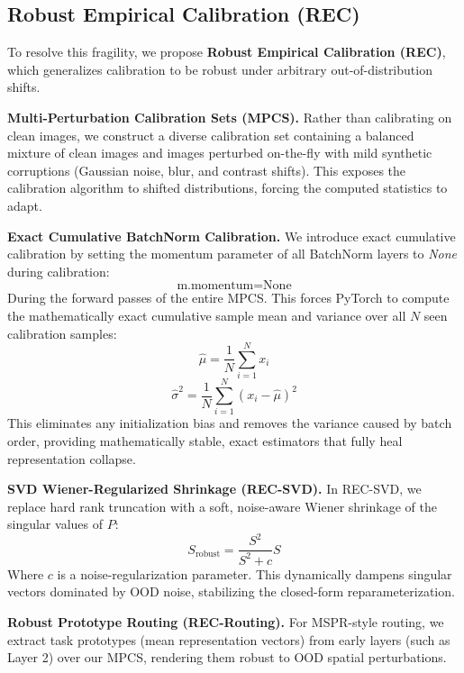 \documentclass{article}
\theoremstyle{plain}
\theoremstyle{definition}
\theoremstyle{remark}
\begin{document}
\subsection{Robust Empirical Calibration (REC)}
To resolve this fragility, we propose \textbf{Robust Empirical Calibration (REC)}, which generalizes calibration to be robust under arbitrary out-of-distribution shifts.

\textbf{Multi-Perturbation Calibration Sets (MPCS).} Rather than calibrating on clean images, we construct a diverse calibration set containing a balanced mixture of clean images and images perturbed on-the-fly with mild synthetic corruptions (Gaussian noise, blur, and contrast shifts). This exposes the calibration algorithm to shifted distributions, forcing the computed statistics to adapt.

\textbf{Exact Cumulative BatchNorm Calibration.} We introduce exact cumulative calibration by setting the momentum parameter of all BatchNorm layers to \textit{None} during calibration:
\begin{equation}
    \text{m.momentum} = \text{None}
\end{equation}
During the forward passes of the entire MPCS. This forces PyTorch to compute the mathematically exact cumulative sample mean and variance over all $N$ seen calibration samples:
\begin{equation}
    \hat{\mu} = \frac{1}{N} \sum_{i=1}^N x_i
\end{equation}
\begin{equation}
    \hat{\sigma}^2 = \frac{1}{N} \sum_{i=1}^N (x_i - \hat{\mu})^2
\end{equation}
This eliminates any initialization bias and removes the variance caused by batch order, providing mathematically stable, exact estimators that fully heal representation collapse.

\textbf{SVD Wiener-Regularized Shrinkage (REC-SVD).} In REC-SVD, we replace hard rank truncation with a soft, noise-aware Wiener shrinkage of the singular values of $P$:
\begin{equation}
    S_{\text{robust}} = \frac{S^2}{S^2 + c} S
\end{equation}
Where $c$ is a noise-regularization parameter. This dynamically dampens singular vectors dominated by OOD noise, stabilizing the closed-form reparameterization.

\textbf{Robust Prototype Routing (REC-Routing).} For MSPR-style routing, we extract task prototypes (mean representation vectors) from early layers (such as Layer 2) over our MPCS, rendering them robust to OOD spatial perturbations.
\end{document}
